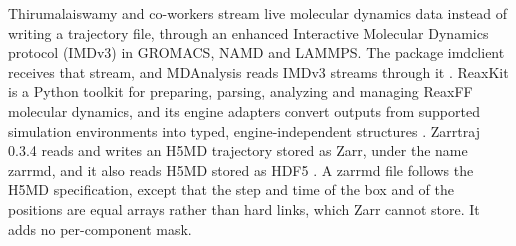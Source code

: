 \documentclass[preprint,12pt]{elsarticle}
\begin{document}
Thirumalaiswamy and co-workers stream live molecular dynamics data instead of writing a trajectory file, through an enhanced Interactive Molecular Dynamics protocol (IMDv3) in GROMACS, NAMD and LAMMPS.
The package imdclient receives that stream, and MDAnalysis reads IMDv3 streams through it \cite{thirumalaiswamyStreamingMd2026}.
ReaxKit is a Python toolkit for preparing, parsing, analyzing and managing ReaxFF molecular dynamics, and its engine adapters convert outputs from supported simulation environments into typed, engine-independent structures \cite{dinaniReaxkit2026}.
Zarrtraj 0.3.4 reads and writes an H5MD trajectory stored as Zarr, under the name zarrmd, and it also reads H5MD stored as HDF5 \cite{woodsZarrtrajPythonPackage2026}.
A zarrmd file follows the H5MD specification, except that the step and time of the box and of the positions are equal arrays rather than hard links, which Zarr cannot store.
It adds no per-component mask.

\begin{table}[tbp] \centering \scriptsize \caption{Restart record against the other routes of Table~\ref{tab:survey}.
``Scan'' means the reader walks the file to find a frame.
``Offsets'' means the reader records a byte offset during that walk, which stays serial because each start depends on the counts before it.}
\label{tab:compare} \setlength{\tabcolsep}{4pt}  \end{table}
\end{document}
